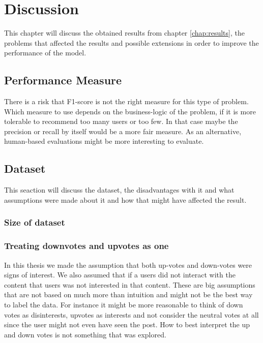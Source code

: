\chapter{Discussion}

This chapter will discuss the obtained results from chapter \ref{chap:results}, the problems that affected the results and possible extensions in order to improve the performance of the model.

\section{Performance Measure}%
There is a risk that F1-score is not the right measure for this type of problem. Which measure to use depends on the business-logic of the problem, if it is more tolerable to recommend too many users or too few. In that case maybe the precision or recall by itself would be a more fair measure. 
As an alternative, human-based evaluations might be more interesting to evaluate.



\section{Dataset}
This seaction will discuss the dataset, the disadvantages with it and what assumptions were made about it and how that might have affected the result.
\subsection{Size of dataset}
\subsection{Treating downvotes and upvotes as one}
In this thesis we made the assumption that both up-votes and down-votes were signs of interest. We also assumed that if a users did not interact with the content that users was not interested in that content. These are big assumptions that are not based on much more than intuition and might not be the best way to label the data. For instance it might be more reasonable to think of down votes as disinterests, upvotes as interests and not consider the neutral votes at all since the user might not even have seen the post. How to best interpret the up and down votes is not something that was explored.

